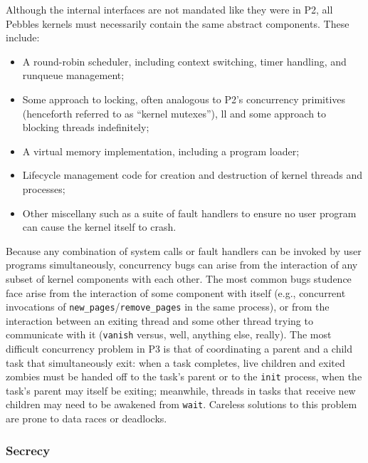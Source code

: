 Although the internal interfaces are not mandated like they were in P2, all Pebbles kernels must necessarily contain the same abstract components. These include:
\begin{itemize}
	\item A round-robin scheduler, including context switching, timer handling, and runqueue management;
	\item Some approach to locking, often analogous to P2's concurrency primitives (henceforth referred to as ``kernel mutexes''), 
	 ll       and some approach to blocking threads indefinitely;
	\item A virtual memory implementation, including a program loader;
	\item Lifecycle management code for creation and destruction of kernel threads and processes;
	\item Other miscellany such as a suite of fault handlers to ensure no user program can cause the kernel itself to crash.
\end{itemize}
Because any combination of system calls or fault handlers can be invoked by user programs simultaneously,
concurrency bugs can arise from the interaction of any subset of kernel components with each other.
The most common bugs studence face arise from the interaction of some component with itself (e.g., concurrent invocations of {\tt new\_pages}/{\tt remove\_pages} in the same process),
or from the interaction between an exiting thread and some other thread trying to communicate with it ({\tt vanish} versus, well, anything else, really).
The most difficult concurrency problem in P3 is that of coordinating a parent and a child task that simultaneously exit:
when a task completes, live children and exited zombies must be handed off to the task's parent or to the {\tt init} process,
when the task's parent may itself be exiting;
meanwhile, threads in tasks that receive new children may need to be awakened from {\tt wait}.
Careless solutions to this problem are prone to data races or deadlocks.


\subsubsection{Secrecy}
\label{sec:410-secrecy}

